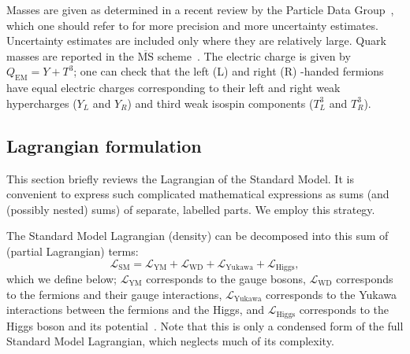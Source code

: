 \begin{table}[tp]
{Masses are given as determined in a recent review by the
Particle Data Group~\cite{pdg2022ynf}, which one should refer to for more
precision and more uncertainty estimates.
Uncertainty estimates are included only where they are relatively large.
Quark masses are reported in the $\overline{\mathrm{MS}}$ scheme~\cite{
pdg2022ynf,
PhysRevD.18.3998
}.
The electric charge is given by $Q_{\mathrm{EM}} = Y + T^3$; one can check
that the left (L) and right (R) -handed fermions have equal electric charges
corresponding to their left and right weak hypercharges ($Y_L$ and $Y_R$)
and third weak isospin components ($T^3_L$ and $T^3_R$).
}
\label{tab:theory_particles_sm_properties}
\end{table}

\subsection{Lagrangian formulation}
\label{sec:theory_sm_lagrangian}
This section briefly reviews the Lagrangian of the Standard Model.
It is convenient to express such complicated mathematical expressions as sums
(and (possibly nested) sums)
of separate, labelled parts.
We employ this strategy.

The Standard Model Lagrangian (density) can be decomposed into this sum of
(partial Lagrangian) terms:
\begin{equation}
\label{eqn:theory_sm_lagrangian_top_sum}
\mathcal{L}_\mathrm{SM} =
\mathcal{L}_\mathrm{YM}
+ \mathcal{L}_\mathrm{WD}
+ \mathcal{L}_\mathrm{Yukawa}
+ \mathcal{L}_\mathrm{Higgs}
,
\end{equation}
which we define below;
$\mathcal{L}_\mathrm{YM}$ corresponds to the gauge bosons,
$\mathcal{L}_\mathrm{WD}$ corresponds to the fermions and their gauge
interactions,
$\mathcal{L}_\mathrm{Yukawa}$ corresponds to the Yukawa interactions between the
fermions and the Higgs,
and
$\mathcal{L}_\mathrm{Higgs}$ corresponds to the Higgs boson and its
potential~\cite{ramond1999journeys,pdg2022ynf}.
Note that this is only a condensed form of the full Standard Model Lagrangian,
which neglects much of its complexity.

